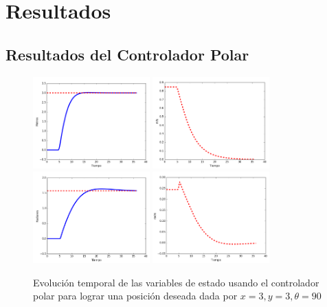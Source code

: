 \chapter{Resultados}
\section {Resultados del Controlador Polar}
\begin{figure}%
  \centering \footnotesize
  \includegraphics[width=0.40\textwidth]{images/tvsxy_tesis.png}
  \includegraphics[width=0.40\textwidth]{images/tvsv_tesis.png}
  \includegraphics[width=0.40\textwidth]{images/tvstheta_tesis.png}
  \includegraphics[width=0.40\textwidth]{images/tvsomega_tesis.png}
  \captionsetup{font=footnotesize}
  \caption{Evolución temporal de las variables de estado usando el controlador polar 
  para lograr una posición deseada dada por $x = 3, y = 3, \theta = 90$}
  \label{f:PolarControl}
\end{figure}
